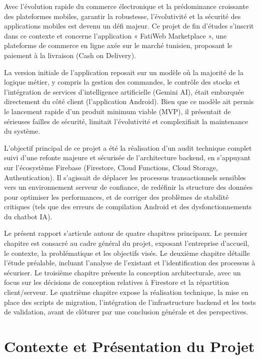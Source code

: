 \documentclass[12pt,a4paper]{report}
\begin{document}
Avec l'évolution rapide du commerce électronique et la prédominance croissante des plateformes mobiles, garantir la robustesse, l'évolutivité et la sécurité des applications mobiles est devenu un défi majeur. Ce projet de fin d'études s'inscrit dans ce contexte et concerne l'application « FatiWeb Marketplace », une plateforme de commerce en ligne axée sur le marché tunisien, proposant le paiement à la livraison (Cash on Delivery).

La version initiale de l'application reposait sur un modèle où la majorité de la logique métier, y compris la gestion des commandes, le contrôle des stocks et l'intégration de services d'intelligence artificielle (Gemini AI), était embarquée directement du côté client (l'application Android). Bien que ce modèle ait permis le lancement rapide d'un produit minimum viable (MVP), il présentait de sérieuses failles de sécurité, limitait l'évolutivité et complexifiait la maintenance du système.

L'objectif principal de ce projet a été la réalisation d'un audit technique complet suivi d'une refonte majeure et sécurisée de l'architecture backend, en s'appuyant sur l'écosystème Firebase (Firestore, Cloud Functions, Cloud Storage, Authentication). Il s'agissait de déplacer les processus transactionnels sensibles vers un environnement serveur de confiance, de redéfinir la structure des données pour optimiser les performances, et de corriger des problèmes de stabilité critiques (tels que des erreurs de compilation Android et des dysfonctionnements du chatbot IA).

Le présent rapport s'articule autour de quatre chapitres principaux. Le premier chapitre est consacré au cadre général du projet, exposant l'entreprise d'accueil, le contexte, la problématique et les objectifs visés. Le deuxième chapitre détaille l'étude préalable, incluant l'analyse de l'existant et l'identification des processus à sécuriser. Le troisième chapitre présente la conception architecturale, avec un focus sur les décisions de conception relatives à Firestore et la répartition client/serveur. Le quatrième chapitre expose la réalisation technique, la mise en place des scripts de migration, l'intégration de l'infrastructure backend et les tests de validation, avant de clôturer par une conclusion générale et des perspectives.

\chapter{Contexte et Présentation du Projet}
\end{document}

